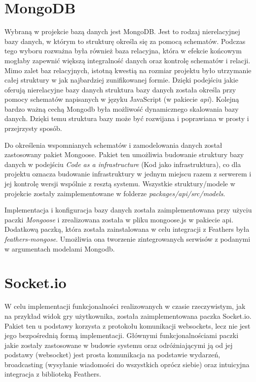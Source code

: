 \section{MongoDB}
Wybraną w projekcie bazą danych jest MongoDB. Jest to rodzaj nierelacyjnej bazy danych, w którym to strukturę określa się za pomocą schematów. Podczas tego wyboru rozważna była również baza relacyjna, która w efekcie końcowym mogłaby zapewnić większą integralność danych oraz kontrolę schematów i relacji. Mimo zalet baz relacyjnych, istotną kwestią na rozmiar projektu było utrzymanie całej struktury w jak najbardziej zunifikowanej formie. Dzięki podejściu jakie oferują nierelacyjne bazy danych struktura bazy danych została określa przy pomocy schematów napisanych w języku JavaScript (w pakiecie \textit{api}). Kolejną bardzo ważną cechą Mongodb była możliwość dynamicznego skalowania bazy danych. Dzięki temu struktura bazy może być rozwijana i poprawiana w prosty i przejrzysty sposób.

Do określenia wspomnianych schematów i zamodelowania danych został zastosowany pakiet Mongoose. Pakiet ten umożliwia budowanie struktury bazy danych w podejściu \textit{Code as a infrastructure} (Kod jako infrastruktura), co dla projektu oznacza budowanie infrastruktury w jednym miejscu razem z serwerem i jej kontrolę wersji wspólnie z resztą systemu. Wszystkie struktury/modele w projekcie zostały zaimplementowane w folderze \textit{packages/api/src/models}.

Implementacja i konfiguracja bazy danych została zaimplementowana przy użyciu paczki \textit{Mongoose} i zrealizowana została w pliku mongoose.js w pakiecie api. Dodatkową paczką, która została zainstalowana w celu integracji z Feathers była \textit{feathers-mongose}. Umożliwia ona tworzenie zintegrowanych serwisów z podanymi w argumentach modelami Mongodb.

\section{Socket.io}
W celu implementacji funkcjonalności realizowanych w czasie rzeczywistym, jak na przykład widok gry użytkownika, została zaimplementowana paczka Socket.io. Pakiet ten u podstawy korzysta z protokołu komunikacji websockets, lecz nie jest jego bezpośrednią formą implementacji. Głównymi funkcjonalnościami paczki jakie zostały zastosowane w budowie systemu oraz odróżniającymi ją od jej podstawy (websocket) jest prosta komunikacja na podstawie wydarzeń, broadcasting (wysyłanie wiadomości do wszystkich oprócz siebie) oraz intuicyjna integracja z biblioteką Feathers.

